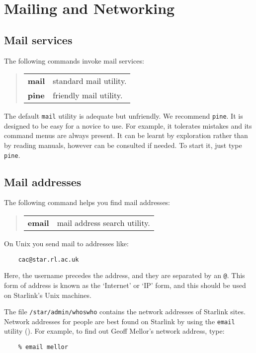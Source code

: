\newpage

\section{Mailing and Networking\label{Mail}}

\subsection{Mail services}

The following commands invoke mail services:
\begin{quote}
\begin{tabular}{lp{67mm}}

{\bf mail}  & standard mail utility.\\
{\bf pine}  & friendly mail utility.

\end{tabular}
\end{quote}
The default {\tt mail} utility is adequate but unfriendly.
We recommend {\tt pine}.
It is designed to be easy for a novice to use.
For example, it tolerates mistakes and its command menus are always present.
It can be learnt by exploration rather than by reading manuals, however
 can be consulted if needed.
To start it, just type {\tt pine}.

\subsection{Mail addresses}

The following command helps you find mail addresses:
\begin{quote}
\begin{tabular}{lp{67mm}}

{\bf email}  & mail address search utility.

\end{tabular}
\end{quote}
On Unix you send mail to addresses like:
\begin{verbatim}
    cac@star.rl.ac.uk
\end{verbatim}
Here, the username precedes the address, and they are separated
by an {\tt @}.
This form of address is known as the `Internet' or `IP' form, and this
should be used on Starlink's Unix machines. 

The file {\tt /star/admin/whoswho} contains the network addresses of Starlink
sites.
Network addresses for people are best found on Starlink by using the
{\tt email} utility
().
For example, to find out Geoff Mellor's network address, type:
\begin{verbatim}
    % email mellor
\end{verbatim}

